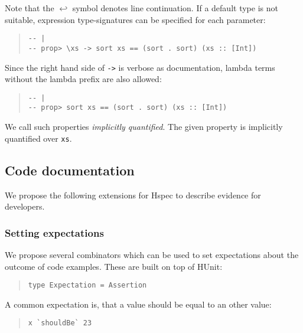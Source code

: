 \documentclass[preprint]{sigplanconf}
\begin{document}
\noindent Note that the $\hookleftarrow$ symbol denotes line
continuation.
If a default type is not suitable, expression type-signatures can be
specified for each parameter:

\begin{quote}
\small
\begin{verbatim}
-- |
-- prop> \xs -> sort xs == (sort . sort) (xs :: [Int])
\end{verbatim}
\end{quote}

\noindent Since the right hand side of {\tt ->} is verbose as documentation,
lambda terms without the lambda prefix are also allowed:

\begin{quote}
\small
\begin{verbatim}
-- |
-- prop> sort xs == (sort . sort) (xs :: [Int])
\end{verbatim}
\end{quote}

\noindent We call such properties \emph{implicitly quantified}.  The
given property is implicitly quantified over \verb|xs|.

\subsection{Code documentation}
\label{sec:code-doc}

We propose the following extensions for Hspec to
describe evidence for developers.

\subsubsection{Setting expectations}

We propose several combinators which can be used to set expectations
about the outcome of code examples.  These are built on top of HUnit:

\begin{quote}
\small
\begin{verbatim}
type Expectation = Assertion
\end{verbatim}
\end{quote}

\noindent A common expectation is, that a value should be equal to an other
value:

\begin{quote}
\small
\begin{verbatim}
x `shouldBe` 23
\end{verbatim}
\end{quote}
\end{document}
